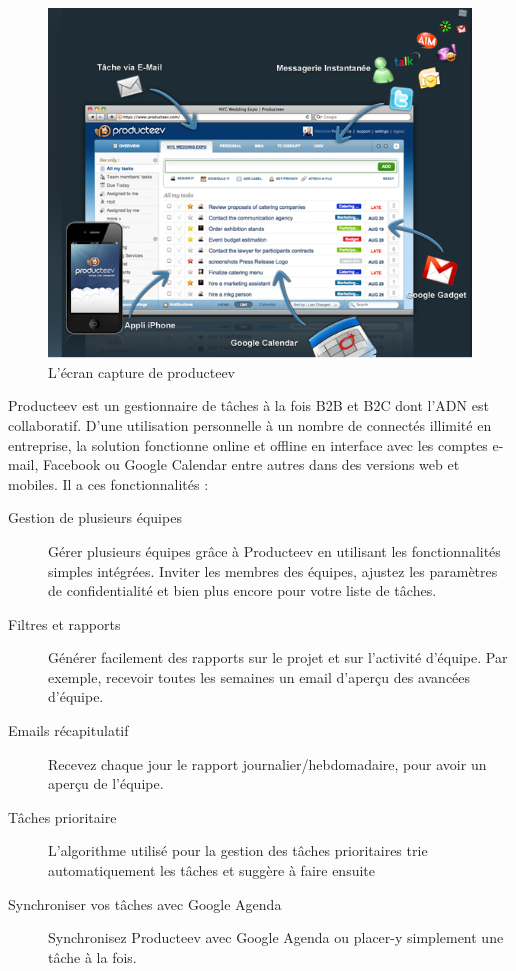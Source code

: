 \begin{figure}[htbp]
	\centering
		\includegraphics[width=6in]{Image/Producteev.png}
	\caption{L'écran capture de producteev}
	\label{fig:Image_Producteev}
\end{figure}

Producteev est un gestionnaire de tâches à la fois B2B et B2C dont l’ADN est collaboratif. D’une utilisation personnelle à un nombre de connectés illimité en entreprise, la solution fonctionne online et offline en interface avec les comptes e-mail, Facebook ou Google Calendar entre autres dans des versions web et mobiles. Il a ces fonctionnalités :
\begin{description}
	\item[Gestion de plusieurs équipes] Gérer plusieurs équipes grâce à Producteev en utilisant les fonctionnalités simples intégrées. Inviter les membres des équipes, ajustez les paramètres de confidentialité et bien plus encore pour votre liste de tâches.
	\item[Filtres et rapports] Générer facilement des rapports sur le projet et sur l'activité d'équipe. Par exemple, recevoir toutes les semaines un email d'aperçu des avancées d'équipe.
	\item[Emails récapitulatif] Recevez chaque jour le rapport journalier/hebdomadaire, pour avoir un aperçu de l'équipe.
	\item[Tâches prioritaire] L’algorithme utilisé pour la gestion des tâches prioritaires trie automatiquement les tâches et  suggère à faire ensuite
	\item[Synchroniser vos tâches avec Google Agenda] Synchronisez Producteev avec Google Agenda ou placer-y simplement une tâche à la fois. 
\end{description}

